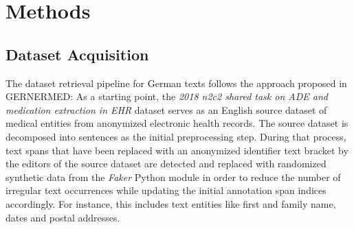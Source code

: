 \documentclass[runningheads]{llncs}
\begin{document}
\section{Methods}

\subsection{Dataset Acquisition}
The dataset retrieval pipeline for German texts follows the approach proposed in GERNERMED\cite{frei_gernermed_2022}: As a starting point, the \textit{2018 n2c2 shared task on ADE and medication extraction in EHR} dataset serves as an English source dataset of medical entities from anonymized electronic health records. The source dataset is decomposed into sentences as the initial preprocessing step. During that process, text spans that have been replaced with an anonymized identifier text bracket by the editors of the source dataset are detected and replaced with randomized synthetic data from the \textit{Faker} Python module in order to reduce the number of irregular text occurrences while updating the initial annotation span indices accordingly. For instance, this includes text entities like first and family name, dates and postal addresses.
\end{document}
